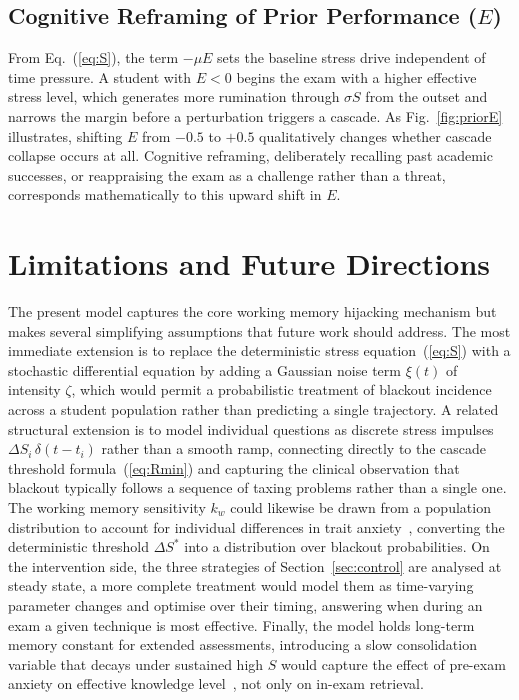 \subsection{Cognitive Reframing of Prior Performance \texorpdfstring{($E$)}{(E)}}

From Eq.~(\ref{eq:S}), the term $-\mu E$ sets the baseline stress
drive independent of time pressure. A student with $E<0$ begins
the exam with a higher effective stress level, which generates
more rumination through $\sigma S$ from the outset and narrows
the margin before a perturbation triggers a cascade. As
Fig.~\ref{fig:priorE} illustrates, shifting $E$ from $-0.5$ to
$+0.5$ qualitatively changes whether cascade collapse occurs at
all. Cognitive reframing, deliberately recalling past academic
successes, or reappraising the exam as a challenge rather than a
threat, corresponds mathematically to this upward shift in $E$.


\section{Limitations and Future Directions}
\label{sec:future}

The present model captures the core working memory hijacking
mechanism but makes several simplifying assumptions that future
work should address. The most immediate extension is to replace
the deterministic stress equation~(\ref{eq:S}) with a stochastic
differential equation by adding a Gaussian noise term $\xi(t)$ of
intensity $\zeta$, which would permit a probabilistic treatment of
blackout incidence across a student population rather than
predicting a single trajectory. A related structural extension is
to model individual questions as discrete stress impulses
$\Delta S_i\,\delta(t-t_i)$ rather than a smooth ramp, connecting
directly to the cascade threshold formula~(\ref{eq:Rmin}) and
capturing the clinical observation that blackout typically follows
a sequence of taxing problems rather than a single one. The working
memory sensitivity $k_w$ could likewise be drawn from a population
distribution to account for individual differences in trait
anxiety~\cite{eysenck2007}, converting the deterministic threshold
$\Delta S^*$ into a distribution over blackout probabilities. On
the intervention side, the three strategies of
Section~\ref{sec:control} are analysed at steady state, a more
complete treatment would model them as time-varying parameter
changes and optimise over their timing, answering when during an
exam a given technique is most effective. Finally, the model holds
long-term memory constant for extended assessments, introducing a
slow consolidation variable that decays under sustained high $S$
would capture the effect of pre-exam anxiety on effective knowledge
level~\cite{baddeley1986}, not only on in-exam retrieval.


